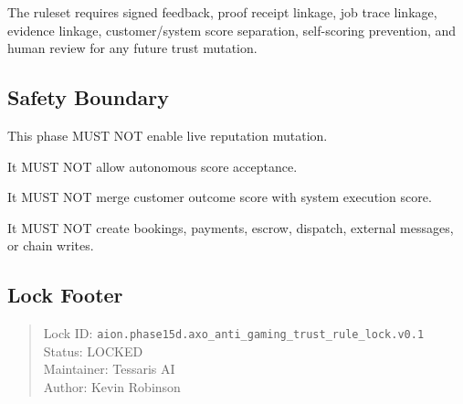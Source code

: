The ruleset requires signed feedback, proof receipt linkage, job trace linkage, evidence linkage, customer/system score separation, self-scoring prevention, and human review for any future trust mutation.

\subsection{Safety Boundary}

This phase MUST NOT enable live reputation mutation.

It MUST NOT allow autonomous score acceptance.

It MUST NOT merge customer outcome score with system execution score.

It MUST NOT create bookings, payments, escrow, dispatch, external messages, or chain writes.

\subsection{Lock Footer}

\begin{quote}
Lock ID: \texttt{aion.phase15d.axo\_anti\_gaming\_trust\_rule\_lock.v0.1}\\
Status: LOCKED\\
Maintainer: Tessaris AI\\
Author: Kevin Robinson
\end{quote}
